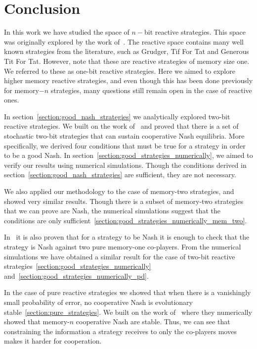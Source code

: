 \documentclass{article}
\theoremstyle{definition}
\begin{document}
\newpage

\section{Conclusion}

In this work we have studied the space of \(n-\)bit reactive strategies. This space
was originally explored by the work of~\citep{nowak:AAM:1990}. The reactive
space contains many well known strategies from the literature, such as Grudger,
Tif For Tat and Generous Tit For Tat. However, note that these are reactive
strategies of memory size one. We referred to these as one-bit reactive
strategies. Here we aimed to explore higher memory reactive strategies, and even
though this has been done previously for memory\(-n\) strategies, many questions
still remain open in the case of reactive ones.

In section~\ref{section:good_nash_strategies} we analytically explored two-bit
reactive strategies. We built on the work of~\citep{akin:EGADS:2016} and proved
that there is a set of stochastic two-bit strategies that can sustain
cooperative Nash equilibria. More specifically, we derived four conditions that
must be true for a strategy in order to be a good Nash. In
section~\ref{section:good_strategies_numerically}, we aimed to verify our
results using numerical simulations. Though the conditions derived in
section~\ref{section:good_nash_strategies} are sufficient, they are not
necessary.

We also applied our methodology to the case of memory-two strategies, and showed
very similar results. Though there is a subset of memory-two strategies that we
can prove are Nash, the numerical simulations suggest that the conditions are
only sufficient~\ref{section:good_strategies_numerically_mem_two}.

In~\citep{akin:EGADS:2016} it is also proven that for a strategy to be Nash it
is enough to check that the strategy is Nash against two pure memory-one
co-players. From the numerical simulations we have obtained a similar result for
the case of two-bit reactive
strategies~\ref{section:good_strategies_numerically}
and~\ref{section:good_strategies_numerically_pd}.

In the case of pure reactive strategies we showed that when there is a
vanishingly small probability of error, no cooperative Nash is evolutionary
stable~\ref{section:pure_strategies}. We
built on the work of~\citep{hilbe:PNAS:2017} where they numerically showed that
memory-\(n\) cooperative Nash are stable. Thus, we can see that constraining
the information a strategy receives to only the co-players moves makes it harder
for cooperation.
\end{document}
